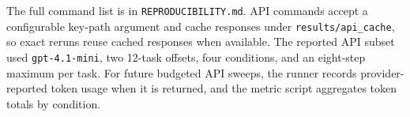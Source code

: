 \documentclass{article} %
\begin{document}
The full command list is in \texttt{REPRODUCIBILITY.md}. API commands accept a
configurable key-path argument and cache responses under
\texttt{results/api\_cache}, so exact reruns reuse cached responses when
available. The reported API subset used \texttt{gpt-4.1-mini}, two 12-task
offsets, four conditions, and an eight-step maximum per task. For future
budgeted API sweeps, the runner records provider-reported token usage when it is
returned, and the metric script aggregates token totals by condition.
\end{document}
